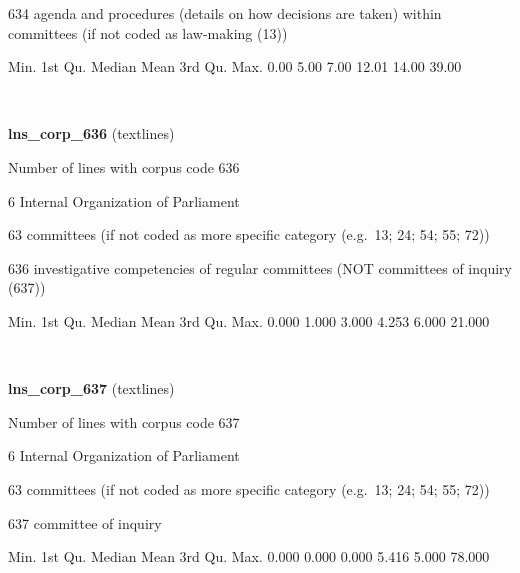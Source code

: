 \documentclass[]{article}
\newenvironment{Shaded}{\begin{snugshade}}{\end{snugshade}}
\newcommand{\FloatTok}[1]{\textcolor[rgb]{0.00,0.00,0.81}{{#1}}}
\newcommand{\NormalTok}[1]{{#1}}
\begin{document}
634 agenda and procedures (details on how decisions are taken) within
committees (if not coded as law-making (13))

\begin{Shaded}
\begin{Highlighting}[]
   \NormalTok{Min. 1st Qu.  Median    Mean 3rd Qu.    Max. }
   \FloatTok{0.00}    \FloatTok{5.00}    \FloatTok{7.00}   \FloatTok{12.01}   \FloatTok{14.00}   \FloatTok{39.00} 
\end{Highlighting}
\end{Shaded}

~

\vspace{1em}

\textbf{lns\_corp\_636} (textlines)

Number of lines with corpus code 636

6 Internal Organization of Parliament

63 committees (if not coded as more specific category (e.g.~13; 24; 54;
55; 72))

636 investigative competencies of regular committees (NOT committees of
inquiry (637))

\begin{Shaded}
\begin{Highlighting}[]
   \NormalTok{Min. 1st Qu.  Median    Mean 3rd Qu.    Max. }
  \FloatTok{0.000}   \FloatTok{1.000}   \FloatTok{3.000}   \FloatTok{4.253}   \FloatTok{6.000}  \FloatTok{21.000} 
\end{Highlighting}
\end{Shaded}

~

\vspace{1em}

\textbf{lns\_corp\_637} (textlines)

Number of lines with corpus code 637

6 Internal Organization of Parliament

63 committees (if not coded as more specific category (e.g.~13; 24; 54;
55; 72))

637 committee of inquiry

\begin{Shaded}
\begin{Highlighting}[]
   \NormalTok{Min. 1st Qu.  Median    Mean 3rd Qu.    Max. }
  \FloatTok{0.000}   \FloatTok{0.000}   \FloatTok{0.000}   \FloatTok{5.416}   \FloatTok{5.000}  \FloatTok{78.000} 
\end{Highlighting}
\end{Shaded}
\end{document}
